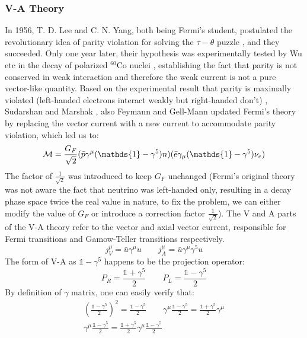 \subsubsection{V-A Theory}
In 1956, T. D. Lee and C. N. Yang, both being Fermi's student, postulated the
revolutionary idea of parity violation for solving the $\tau-\theta$ puzzle \cite{PhysRev.105.1671}, 
and they succeeded. Only one year later, their hypothesis was experimentally tested
by Wu etc in the decay of polarized ${}^{60}$Co nuclei \cite{PhysRev.105.1413}, 
establishing the fact that parity is not conserved in weak interaction and 
therefore the weak current is not a pure vector-like quantity. 
Based on the experimental result that parity is maximally violated (left-handed 
electrons interact weakly but right-handed don't) \cite{PhysRev.109.1015}, 
Sudarshan and Marshak \cite{PhysRev.109.1860.2}, also Feymann and Gell-Mann \cite{PhysRev.109.193}
updated Fermi's theory by replacing the vector current with a new current to 
accommodate parity violation, which led us to:
\begin{equation}
    \CM = \frac{G_F}{\sqrt{2}}(\bar{p} \gamma^\mu(\mathds{1} - \gamma^5) n) (\bar{e} \gamma_\mu(\mathds{1} - \gamma^5) \nu_e)
\end{equation}
The factor of $\frac{1}{\sqrt{2}}$ was introduced to keep $G_F$ unchanged (Fermi's
original theory was not aware the fact that neutrino was left-handed only, resulting
in a decay phase space twice the real value in nature, to fix the problem, we can
either modify the value of $G_F$ or introduce a correction factor $\frac{1}{\sqrt{2}}$).
The V and A parts of the V-A theory refer to the vector and axial vector current, 
responsible for Fermi transitions and Gamow-Teller transitions respectively.
\begin{equation}
    j_V^\mu = \bar{u}\gamma^\mu u   \qquad 
    j_A^\mu = \bar{u}\gamma^\mu\gamma^5 u   
\end{equation}
The form of V-A as $\mathds{1} - \gamma^5$ happens to be the projection operator:
\begin{equation}
    P_R = \frac{\mathds{1} + \gamma^5}{2}   \qquad P_L = \frac{\mathds{1} - \gamma^5}{2}
\end{equation}
By definition of $\gamma$ matrix, one can easily verify that:
\begin{equation}
    \begin{gathered}
	\left(\frac{\mathds{1} - \gamma^5}{2} \right)^2 = \frac{\mathds{1} - \gamma^5}{2} 
	\qquad 
	\gamma^\mu \frac{\mathds{1} - \gamma^5}{2} = \frac{\mathds{1} + \gamma^5}{2} \gamma^\mu \\
	\gamma^\mu \frac{\mathds{1} - \gamma^5}{2} = \frac{\mathds{1} + \gamma^5}{2} \gamma^\mu \frac{\mathds{1}-\gamma^5}{2}
    \end{gathered}
\end{equation}

